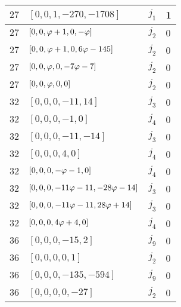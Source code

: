 \documentclass{amsart}
\begin{document}
\begin{center}
\begin{table}[h]
\begin{tabular}{|c|l|l|l|}
$27$ & $\left[0, 0, 1, -270, -1708\right]$ & $j_1$ & 1\\\hline %
$27$ & $\left[0, 0, \varphi + 1, 0, -\varphi \right]$ & $j_2$& 0 \\\hline %
$27$ & $\left[0, 0, \varphi + 1, 0, 6\varphi - 145\right]$ & $j_2$ & 0\\\hline %
$27$ & $\left[0, 0, \varphi, 0, -7\varphi - 7\right]$ & $j_2$ & 0 \\\hline %
$27$ & $\left[0, 0, \varphi, 0, 0\right]$ & $j_2$ & 0 \\\hline %
$32$ & $\left[0, 0, 0, -11, 14\right]$ & $j_3$& 0 \\\hline %
$32$ & $\left[0, 0, 0, -1, 0\right]$ & $j_4$ & 0 \\\hline %
$32$ & $\left[0, 0, 0, -11, -14\right]$ & $j_3$ & 0 \\\hline %
 $32$ & $\left[0, 0, 0, 4, 0\right]$ & $j_4$ & 0 \\\hline %
$32$ & $\left[0, 0, 0, -\varphi - 1, 0\right]$ & $j_4$ & 0 \\\hline %
$32$ & $\left[0, 0, 0, -11\varphi - 11, -28\varphi - 14\right]$ & $j_3$ & 0\\\hline %
$32$ & $\left[0, 0, 0, -11\varphi - 11, 28\varphi + 14\right]$ & $j_3$& 0 \\\hline %
$32$ & $\left[0, 0, 0, 4\varphi + 4, 0\right]$ & $j_4$ & 0\\\hline %
$36$ & $\left[0, 0, 0, -15, 2\right]$ & $j_9$& 0 \\\hline %
$36$ & $\left[0, 0, 0, 0, 1\right]$ & $j_2$ & 0 \\\hline %
$36$ & $\left[0, 0, 0, -135, -594\right]$ & $j_9$ & 0 \\\hline %
$36$ & $\left[0, 0, 0, 0, -27\right]$ & $j_2$ & 0 \\\hline %
\end{tabular}
\end{table}
\end{center}
\end{document}
